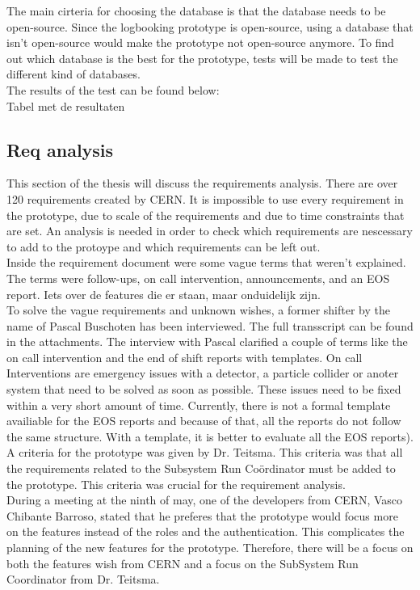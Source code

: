 \documentclass[paper=a4, fontsize=11pt,twoside]{scrartcl}	%
\begin{document}
The main cirteria for choosing the database is that the database needs to be open-source. Since the logbooking prototype is open-source, using a database that isn't open-source would make the prototype not open-source anymore. To find out which database is the best for the prototype, tests will be made to test the different kind of databases. \\
The results of the test can be found below: \\

Tabel met de resultaten \\



\newpage
\subsection{Req analysis}
This section of the thesis will discuss the requirements analysis. There are over 120 requirements created by CERN. It is impossible to use every requirement in the prototype, due to scale of the requirements and due to time constraints that are set. An analysis is needed in order to check which requirements are nescessary to add to the protoype and which requirements can be left out.  \\
Inside the requirement document were some vague terms that weren't explained. The terms were follow-ups, on call intervention, announcements, and an EOS report. Iets over de features die er staan, maar onduidelijk zijn. \\
To solve the vague requirements and unknown wishes, a former shifter by the name of Pascal Buschoten has been interviewed. The full transscript can be found in the attachments. The interview with Pascal clarified a couple of terms like the on call intervention and the end of shift reports with templates. On call Interventions are emergency issues with a detector, a particle collider or anoter system that need to be solved as soon as possible. These issues need to be fixed within a very short amount of time. Currently, there is not a formal template availiable for the EOS reports  and because of that, all the reports do not follow the same structure. With a template, it is better to evaluate all the EOS reports).\\
A criteria for the prototype was given by Dr. Teitsma. This criteria was that all the requirements related to the Subsystem Run Coördinator must be added to the prototype. This criteria was crucial for the requirement analysis. \\
During a meeting at the ninth of may, one of the developers from CERN, Vasco Chibante Barroso, stated that he preferes that the prototype would focus more on the features instead of the roles and the authentication. This complicates the planning of the new features for the prototype. Therefore, there will be a focus on both the features wish from CERN and a focus on the SubSystem Run Coordinator from Dr. Teitsma. \\ 
\end{document}
